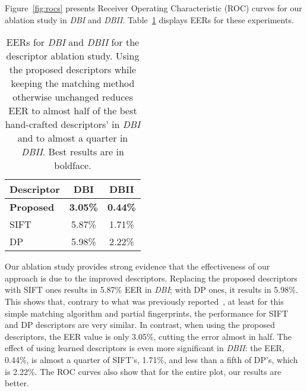 \documentclass[10pt,twocolumn,letterpaper]{article}
\begin{document}
Figure~\ref{fig:rocs} presents Receiver Operating Characteristic (ROC) curves for our ablation study in \textit{DBI} and \textit{DBII}.
Table~\ref{table:ablation} displays EERs for these experiments.

\begin{table}[h]
  \begin{center}
    \begin{tabular}{l|c|c}
      \textbf{Descriptor}                                   & \textbf{DBI}    & \textbf{DBII} \\ \hline
      \textbf{Proposed}                                     & \textbf{3.05\%} & \textbf{0.44\%} \\ \hline
      SIFT                                                  & 5.87\%          & 1.71\% \\ \hline
      DP                                                    & 5.98\%          & 2.22\% \\
    \end{tabular}
  \end{center}
  \vspace{-4pt}
  \caption{EERs for \textit{DBI} and \textit{DBII} for the descriptor ablation study.
  Using the proposed descriptors while keeping the matching method otherwise unchanged reduces EER to almost half of the best hand-crafted descriptors' in \textit{DBI} and to almost a quarter in \textit{DBII}.
  Best results are in boldface.
  }
  \label{table:ablation}
\end{table}

Our ablation study provides strong evidence that the effectiveness of our approach is due to the improved descriptors.
Replacing the proposed descriptors with SIFT ones results in 5.87\% EER in \textit{DBI}; with DP ones, it results in 5.98\%.
This shows that, contrary to what was previously reported~\cite{direct-pore}, at least for this simple matching algorithm and partial fingerprints, the performance for SIFT and DP descriptors are very similar.
In contrast, when using the proposed descriptors, the EER value is only 3.05\%, cutting the error almost in half.
The effect of using learned descriptors is even more significant in \textit{DBII}: the EER, 0.44\%, is almost a quarter of SIFT's, 1.71\%, and less than a fifth of DP's, which is 2.22\%.
The ROC curves also show that for the entire plot, our results are better.
\end{document}
